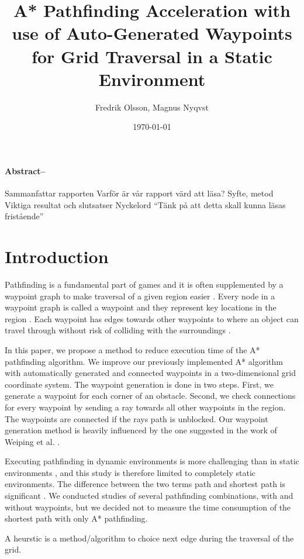 \documentclass[a4paper]{article}
\title{\Huge A* Pathfinding Acceleration with use of Auto-Generated Waypoints for Grid Traversal in a Static Environment}
\author{Fredrik Olsson, Magnus Nyqvst}
\date{\today}
\begin{document}
\maketitle
\newpage
\thispagestyle{empty}
\paragraph{Abstract--}
Sammanfattar rapporten
Varför är vår rapport värd att läsa?
Syfte, metod
Viktiga resultat och slutsatser Nyckelord
“Tänk på att detta skall kunna läsas fristående”

\tableofcontents
\listoffigures
\newpage
{}
\twocolumn
\section{Introduction}
Pathfinding is a fundamental part of games \cite{dynaPF15}\cite{roboGame15} and it is often supplemented by a waypoint graph to make traversal of a given region easier \cite{dynaPF15}. Every node in a waypoint graph is called a waypoint and they represent key locations in the region \cite{dynaPF15}. Each waypoint has edges towards other waypoints to where an object can travel through without risk of colliding with the surroundings \cite{dynaPF15}.
	
In this paper, we propose a method to reduce execution time of the A* pathfinding algorithm. We improve our previously implemented A* algorithm with automatically generated and connected waypoints in a two-dimensional grid coordinate system. The waypoint generation is done in two steps. First, we generate a waypoint for each corner of an obstacle. Second, we check connections for every waypoint by sending a ray towards all other waypoints in the region. The waypoints are connected if the rays path is unblocked. Our waypoint generation method is heavily influenced by the one suggested in the work of Weiping et al. \cite{dynaPF15}.
	
Executing pathfinding in dynamic environments is more challenging than in static environments \cite{dynaPF15}, and this study is therefore limited to completely static environments. The difference between the two terms path and shortest path is significant \cite{heuristicGame15}. We conducted studies of several pathfinding combinations, with and without waypoints, but we decided not to measure the time consumption of the shortest path with only A* pathfinding.
	
A heurstic is a method/algorithm to choice next edge during the traversal of the grid.
\end{document}
